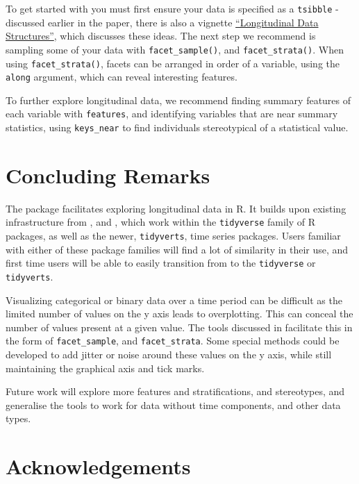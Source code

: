 To get started with  you must first ensure your data is specified as a \texttt{tsibble} - discussed earlier in the paper, there is also a vignette \href{http://brolgar.njtierney.com/articles/longitudinal-data-structures.html}{``Longitudinal Data Structures''}, which discusses these ideas. The next step we recommend is sampling some of your data with \texttt{facet\_sample()}, and \texttt{facet\_strata()}. When using \texttt{facet\_strata()}, facets can be arranged in order of a variable, using the \texttt{along} argument, which can reveal interesting features.

To further explore longitudinal data, we recommend finding summary features of each variable with \texttt{features}, and identifying variables that are near summary statistics, using \texttt{keys\_near} to find individuals stereotypical of a statistical value.

\hypertarget{concluding-remarks}{%
\section{Concluding Remarks}\label{concluding-remarks}}

The  package facilitates exploring longitudinal data in R. It builds upon existing infrastructure from , and , which work within the \texttt{tidyverse} family of R packages, as well as the newer, \texttt{tidyverts}, time series packages. Users familiar with either of these package families will find a lot of similarity in their use, and first time users will be able to easily transition from  to the \texttt{tidyverse} or \texttt{tidyverts}.

Visualizing categorical or binary data over a time period can be difficult as the limited number of values on the y axis leads to overplotting. This can conceal the number of values present at a given value. The tools discussed in  facilitate this in the form of \texttt{facet\_sample}, and \texttt{facet\_strata}. Some special methods could be developed to add jitter or noise around these values on the y axis, while still maintaining the graphical axis and tick marks.

Future work will explore more features and stratifications, and stereotypes, and generalise the tools to work for data without time components, and other data types.

\hypertarget{acknowledgements}{%
\section{Acknowledgements}\label{acknowledgements}}

